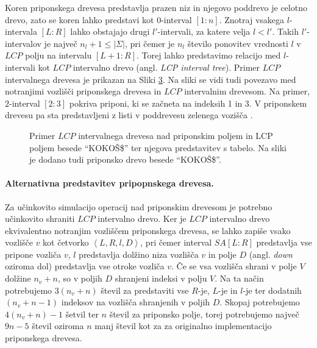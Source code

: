 Koren priponskega drevesa predstavlja prazen niz in njegovo poddrevo je celotno drevo, zato se koren lahko predstavi kot $0$-interval $[1:n]$. Znotraj vsakega $l$-intervala $[L:R]$ lahko obstajajo drugi $l'$-intervali, za katere velja $l<l'$. Takih $l'$-intervalov je največ $n_l+1\le |\Sigma|$, pri čemer je $n_l$ število ponovitev vrednosti $l$ v $LCP$ polju na intervalu $[L+1:R]$. Torej lahko predstavimo relacijo med $l$-intervali kot $LCP$ intervalno drevo (angl. \textit{LCP interval tree}). Primer $LCP$ intervalnega drevesa je prikazan na Sliki \ref{fig:intervalTree}. Na sliki se vidi tudi povezavo med notranjimi vozlišči priponskega drevesa in $LCP$ intervalnim drevesom. Na primer, $2$-interval $[2:3]$ pokriva priponi, ki se začneta na indeksih 1 in 3. V priponskem drevesu pa sta predstavljeni z listi v poddrevesu zelenega vozišča \cite{Abouelhoda2004}.

\begin{figure}[tb]
    \begin{subfigure}[C]{0.45\linewidth}
        \vfill       
        
        \centering
        \vfill
        \subcaption*{}
        \label{fig:aSADrevo}
    \end{subfigure}
    \hfill
    \begin{subfigure}[C]{0.45\linewidth}        
        
        \centering
        \subcaption*{}
        \label{fig:aSAPolje}
    \end{subfigure}
   
    \caption{Primer $LCP$ intervalnega drevesa nad priponskim poljem in LCP poljem besede \enquote{KOKOŠ\$} ter njegova predstavitev s tabelo. Na sliki je dodano tudi priponsko drevo besede \enquote{KOKOŠ\$}.} 
    \label{fig:intervalTree}
\end{figure}

\paragraph{Alternativna predstavitev pripopnskega drevesa.}

Za učinkovito simulacijo operacij nad priponskim drevesom je potrebno učinkovito shraniti $LCP$ intervalno drevo. Ker je $LCP$ intervalno drevo ekvivalentno notranjim vozliščem priponskega drevesa, se lahko zapiše vsako vozlišče $v$ kot četvorko $\left< L, R, l, D \right>$, pri čemer interval $SA[L:R]$ predstavlja vse pripone vozliča $v$, $l$ predstavlja dolžino niza vozlišča $v$ in polje $D$ (angl. \textit{down} oziroma dol) predstavlja vse otroke vozliča $v$. Če se vsa vozlišča shrani v polje $V$ dolžine $n_v+n$, so v poljih $D$ shranjeni indeksi v polju $V$. Na ta način potrebujemo $3(n_v+n)$ števil za predstaviti vse $R$-je, $L$-je in $l$-je ter dodatnih $(n_v+n-1)$ indeksov na vozlišča shranjenih v poljih $D$. Skopaj potrebujemo $4(n_v+n)-1$ šetvil ter $n$ števil za priponsko polje, torej potrebujemo največ $9n-5$ števil oziroma $n$ manj števil kot za za originalno implementacijo priponskega drevesa. 

